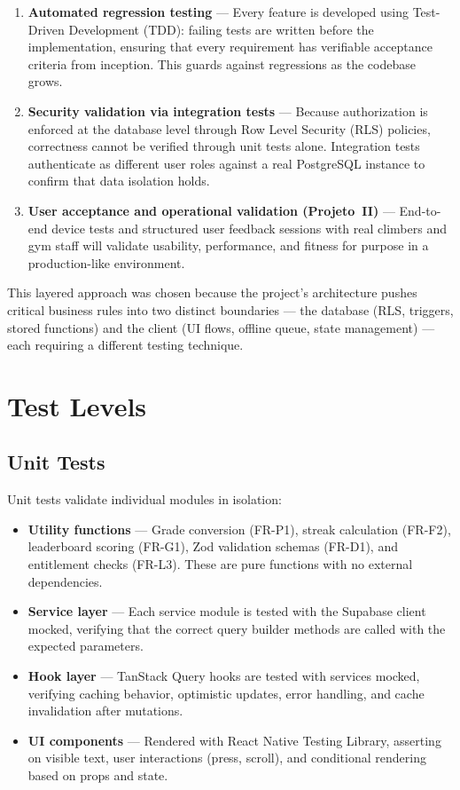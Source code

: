 \documentclass[12pt,a4paper]{report}
\renewcommand\_{\textunderscore\hspace{0pt}}
\begin{document}
\begin{enumerate}[noitemsep]
    \item \textbf{Automated regression testing} --- Every feature is developed using Test-Driven Development (TDD): failing tests are written before the implementation, ensuring that every requirement has verifiable acceptance criteria from inception. This guards against regressions as the codebase grows.
    \item \textbf{Security validation via integration tests} --- Because authorization is enforced at the database level through Row Level Security (RLS) policies, correctness cannot be verified through unit tests alone. Integration tests authenticate as different user roles against a real PostgreSQL instance to confirm that data isolation holds.
    \item \textbf{User acceptance and operational validation (Projeto~II)} --- End-to-end device tests and structured user feedback sessions with real climbers and gym staff will validate usability, performance, and fitness for purpose in a production-like environment.
\end{enumerate}

This layered approach was chosen because the project's architecture pushes critical business rules into two distinct boundaries --- the database (RLS, triggers, stored functions) and the client (UI flows, offline queue, state management) --- each requiring a different testing technique.

\section{Test Levels}

\subsection{Unit Tests}

Unit tests validate individual modules in isolation:

\begin{itemize}[noitemsep]
    \item \textbf{Utility functions} --- Grade conversion (FR-P1), streak calculation (FR-F2), leaderboard scoring (FR-G1), Zod validation schemas (FR-D1), and entitlement checks (FR-L3). These are pure functions with no external dependencies.
    \item \textbf{Service layer} --- Each service module is tested with the Supabase client mocked, verifying that the correct query builder methods are called with the expected parameters.
    \item \textbf{Hook layer} --- TanStack Query hooks are tested with services mocked, verifying caching behavior, optimistic updates, error handling, and cache invalidation after mutations.
    \item \textbf{UI components} --- Rendered with React Native Testing Library, asserting on visible text, user interactions (press, scroll), and conditional rendering based on props and state.
\end{itemize}
\end{document}
